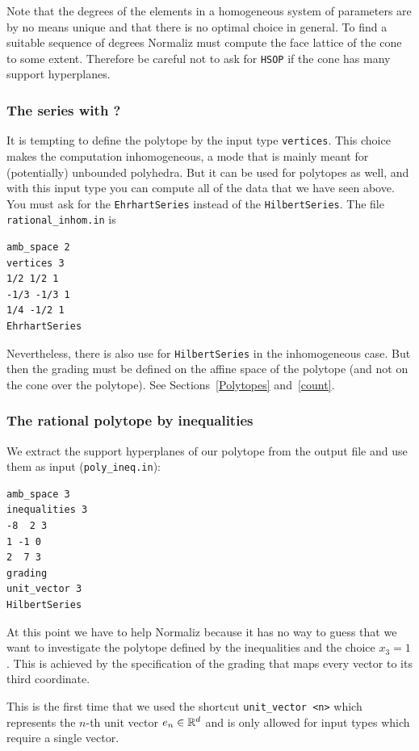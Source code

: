 Note that the degrees of the elements in a homogeneous system of parameters are by no means unique and that there is no optimal choice in general. To find a suitable sequence of degrees Normaliz must compute the face lattice of the cone to some extent. Therefore be careful not to ask for \verb|HSOP| if the cone has many support hyperplanes.

\subsubsection{The series with ?}

It is tempting to define the polytope by the input type \verb|vertices|. This choice makes the computation inhomogeneous, a mode that is mainly meant for (potentially) unbounded polyhedra. But it can be used for polytopes as well, and with this input type you can compute all of the data that we have seen above. You must ask for the \verb|EhrhartSeries| instead of the \verb|HilbertSeries|. The file \verb|rational_inhom.in| is
\begin{Verbatim}
amb_space 2
vertices 3
1/2 1/2 1
-1/3 -1/3 1
1/4 -1/2 1
EhrhartSeries
\end{Verbatim}

Nevertheless, there is also use for \verb|HilbertSeries| in the inhomogeneous case. But then the grading must be defined on the affine space of the polytope (and not on the cone over the polytope). See Sections~\ref{Polytopes} and~\ref{count}.

\subsubsection{The rational polytope by inequalities}\label{rat_ineq}

We extract the support hyperplanes of our polytope from the output file and use them as input (\verb|poly_ineq.in|):
\begin{Verbatim}
amb_space 3
inequalities 3
-8  2 3
1 -1 0
2  7 3
grading
unit_vector 3
HilbertSeries
\end{Verbatim}
At this point we have to help Normaliz because it has no way to guess that we want to investigate the polytope defined by the inequalities and the choice $x_3=1$. This is achieved by the specification of the grading that maps every vector to its third coordinate.

This is the first time that we used the shortcut \verb|unit_vector <n>| which represents the $n$-th unit vector $e_n\in{\mathbb R}^d$ and is only allowed for input types which require a single vector.

